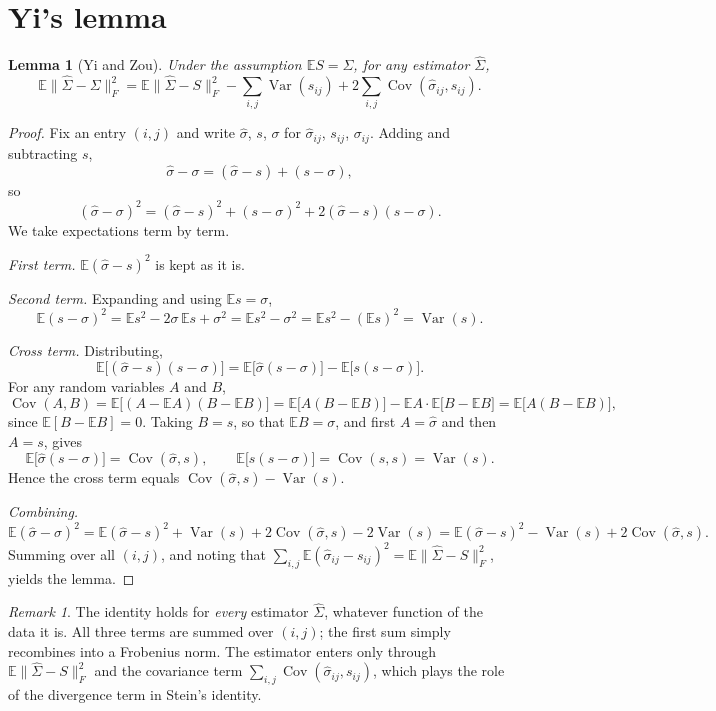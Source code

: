 \documentclass[11pt]{article}
\newtheorem{lemma}{Lemma}
\theoremstyle{remark}
\newtheorem*{remark}{Remark}
\newcommand{\E}{\mathbb{E}}
\newcommand{\Var}{\operatorname{Var}}
\newcommand{\Cov}{\operatorname{Cov}}
\begin{document}
\section{Yi's lemma}

\begin{lemma}[Yi and Zou]\label{lem:yi}
Under the assumption $\E S = \Sigma$, for any estimator $\hat\Sigma$,
\[
\E\|\hat\Sigma - \Sigma\|_F^2
= \E\|\hat\Sigma - S\|_F^2
  - \sum_{i,j}\Var(s_{ij})
  + 2\sum_{i,j}\Cov(\hat\sigma_{ij}, s_{ij}).
\]
\end{lemma}

\begin{proof}
Fix an entry $(i,j)$ and write $\hat\sigma$, $s$, $\sigma$ for
$\hat\sigma_{ij}$, $s_{ij}$, $\sigma_{ij}$. Adding and subtracting $s$,
\[
\hat\sigma - \sigma = (\hat\sigma - s) + (s - \sigma),
\]
so
\[
(\hat\sigma - \sigma)^2
= (\hat\sigma - s)^2 + (s - \sigma)^2 + 2(\hat\sigma - s)(s - \sigma).
\]
We take expectations term by term.

\emph{First term.} $\E(\hat\sigma - s)^2$ is kept as it is.

\emph{Second term.} Expanding and using $\E s = \sigma$,
\[
\E(s-\sigma)^2 = \E s^2 - 2\sigma\,\E s + \sigma^2
               = \E s^2 - \sigma^2
               = \E s^2 - (\E s)^2
               = \Var(s).
\]

\emph{Cross term.} Distributing,
\[
\E\bigl[(\hat\sigma - s)(s - \sigma)\bigr]
= \E\bigl[\hat\sigma(s-\sigma)\bigr] - \E\bigl[s(s-\sigma)\bigr].
\]
For any random variables $A$ and $B$,
\[
\Cov(A,B) = \E\bigl[(A - \E A)(B - \E B)\bigr]
          = \E\bigl[A(B - \E B)\bigr] - \E A\cdot\E\bigl[B - \E B\bigr]
          = \E\bigl[A(B - \E B)\bigr],
\]
since $\E[B - \E B] = 0$. Taking $B = s$, so that $\E B = \sigma$, and first
$A = \hat\sigma$ and then $A = s$, gives
\[
\E\bigl[\hat\sigma(s-\sigma)\bigr] = \Cov(\hat\sigma, s),
\qquad
\E\bigl[s(s-\sigma)\bigr] = \Cov(s,s) = \Var(s).
\]
Hence the cross term equals $\Cov(\hat\sigma, s) - \Var(s)$.

\emph{Combining.}
\[
\E(\hat\sigma - \sigma)^2
= \E(\hat\sigma - s)^2 + \Var(s) + 2\Cov(\hat\sigma, s) - 2\Var(s)
= \E(\hat\sigma - s)^2 - \Var(s) + 2\Cov(\hat\sigma, s).
\]
Summing over all $(i,j)$, and noting that
$\sum_{i,j}\E(\hat\sigma_{ij} - s_{ij})^2 = \E\|\hat\Sigma - S\|_F^2$,
yields the lemma.
\end{proof}

\begin{remark}
The identity holds for \emph{every} estimator $\hat\Sigma$, whatever function
of the data it is. All three terms are summed over $(i,j)$; the first sum
simply recombines into a Frobenius norm. The estimator enters only through
$\E\|\hat\Sigma - S\|_F^2$ and the covariance term
$\sum_{i,j}\Cov(\hat\sigma_{ij}, s_{ij})$, which plays the role of the
divergence term in Stein's identity.
\end{remark}
\end{document}
